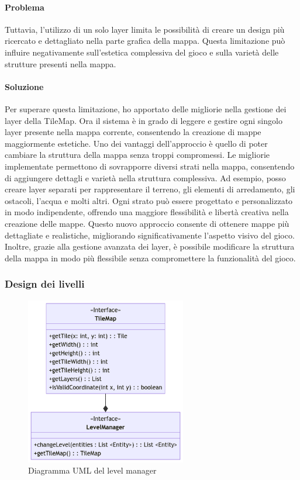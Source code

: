 \documentclass[a4paper,12pt]{report}
\begin{document}
\paragraph*{Problema}
Tuttavia, l'utilizzo di un solo layer limita le possibilità di creare un design più ricercato e dettagliato nella parte grafica della mappa. 
Questa limitazione può influire negativamente sull'estetica complessiva del gioco e sulla varietà delle strutture presenti nella mappa.
\paragraph*{Soluzione}
Per superare questa limitazione, ho apportato delle migliorie nella gestione dei layer della TileMap.
Ora il sistema è in grado di leggere e gestire ogni singolo layer presente nella mappa corrente, consentendo la creazione di mappe maggiormente estetiche.
Uno dei vantaggi dell'approccio è quello di poter cambiare la struttura della mappa senza troppi compromessi.
Le migliorie implementate permettono di sovrapporre diversi strati nella mappa, consentendo di aggiungere dettagli e varietà nella struttura complessiva. 
Ad esempio, posso creare layer separati per rappresentare il terreno, gli elementi di arredamento, gli ostacoli, l'acqua e molti altri. 
Ogni strato può essere progettato e personalizzato in modo indipendente, offrendo una maggiore flessibilità e libertà creativa nella creazione delle mappe.
Questo nuovo approccio consente di ottenere mappe più dettagliate e realistiche, migliorando significativamente l'aspetto visivo del gioco. 
Inoltre, grazie alla gestione avanzata dei layer, è possibile modificare la struttura della mappa in modo più flessibile senza compromettere la funzionalità del gioco.

\subsubsection{Design dei livelli}
\begin{figure}[h]
	\centering
	\includegraphics[width=7cm]{uml/LevelManager.png}
	\caption{Diagramma UML del level manager}
\end{figure}
\end{document}
